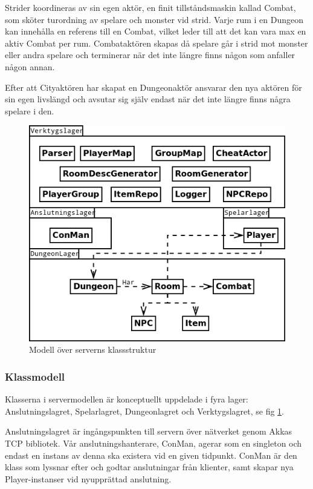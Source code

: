 \documentclass[a4paper]{article}
\begin{document}
Strider koordineras av sin egen aktör, en finit tillståndsmaskin kallad Combat, som sköter turordning av spelare och monster vid strid. Varje rum i en Dungeon kan innehålla en referens till en Combat, vilket leder till att det kan vara max en aktiv Combat per rum. Combataktören skapas då spelare går i strid mot monster eller andra spelare och terminerar när det inte längre finns någon som anfaller någon annan. 

Efter att Cityaktören har skapat en Dungeonaktör ansvarar den nya aktören för sin egen livslängd och avsutar sig själv endast när det inte längre finns några spelare i den.

\begin{figure}[hbt]
\centering
\includegraphics[width=1.0\textwidth]{serverUml2}
\caption{\label{fig:ServerKlassModell}Modell över serverns klassstruktur}
\end{figure}

\subsubsection{Klassmodell}
Klasserna i servermodellen är konceptuellt uppdelade i fyra lager: Anslutningslagret, Spelarlagret, Dungeonlagret och Verktygslagret, se fig \ref{fig:ServerKlassModell}. 

Anslutningslagret är ingångspunkten till servern över nätverket genom Akkas TCP bibliotek. Vår anslutningshanterare, ConMan, agerar som en singleton och endast en instans av denna ska existera vid en given tidpunkt. ConMan är den klass som lyssnar efter och godtar anslutningar från klienter, samt skapar nya Player-instanser vid nyupprättad anslutning. 
\end{document}

